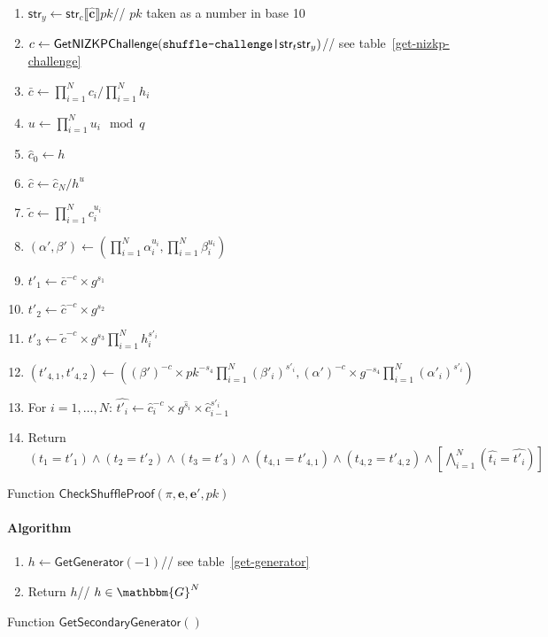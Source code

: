 \documentclass[a4paper]{article}
\newcommand{\G}{\mathbbm{G}}
\begin{document}
\begin{table}
\begin{framed}
\begin{enumerate}
    \item
      $\textsf{str}_y\leftarrow\textsf{str}_c\llbracket\hat{\textbf{c}}\rrbracket
      pk$\hfill// $pk$ taken as a number in base 10
    \item
      $c\leftarrow\textsf{GetNIZKPChallenge}(\verb=shuffle-challenge|=\textsf{str}_t\textsf{str}_y)$\hfill//
      see table~\ref{get-nizkp-challenge}
    \item $\bar{c}\leftarrow\prod_{i=1}^N c_i/\prod_{i=1}^N h_i$
    \item $u\leftarrow\prod_{i=1}^N u_i\mod q$
    \item $\hat{c}_0\leftarrow h$
    \item $\hat{c}\leftarrow\hat{c}_N/h^u$
    \item $\tilde{c}\leftarrow\prod_{i=1}^N c_i^{u_i}$
    \item $(\alpha',\beta')\leftarrow(\prod_{i=1}^N \alpha_i^{u_i},\prod_{i=1}^N \beta_i^{u_i})$
    \item $t'_1\leftarrow\bar{c}^{-c}\times g^{s_1}$
    \item $t'_2\leftarrow\hat{c}^{-c}\times g^{s_2}$
    \item $t'_3\leftarrow\tilde{c}^{-c}\times g^{s_3}\prod_{i=1}^N h_i^{s'_i}$
    \item
      $(t'_{4,1},t'_{4,2})\leftarrow((\beta')^{-c}\times
      pk^{-s_4}\prod_{i=1}^N(\beta'_i)^{s'_i},(\alpha')^{-c}\times
      g^{-s_4}\prod_{i=1}^N(\alpha'_i)^{s'_i})$
    \item For $i=1,\dots,N$: $\hat{t'_i}\leftarrow\hat{c}_i^{-c}\times g^{\hat{s}_i}\times\hat{c}_{i-1}^{s'_i}$
    \item Return
      $(t_1=t'_1)\land(t_2=t'_2)\land(t_3=t'_3)\land(t_{4,1}=t'_{4,1})\land(t_{4,2}=t'_{4,2})\land\left[\bigwedge_{i=1}^N(\hat{t_i}=\hat{t'_i})\right]$
    \end{enumerate}
  \end{framed}
  \caption{Function $\mathsf{CheckShuffleProof}(\pi,\textbf{e},\textbf{e}',pk)$}
  \label{check-shuffle-proof}
\end{table}

\begin{table}
  \begin{framed}
    \noindent\paragraph{Algorithm}
    \begin{enumerate}
    \item $h\leftarrow\textsf{GetGenerator}(-1)$\hfill// see
      table~\ref{get-generator}
    \item Return $h$\hfill// $h\in\G^N$
    \end{enumerate}
  \end{framed}
  \caption{Function $\mathsf{GetSecondaryGenerator}()$}
  \label{get-secondary-generator}
\end{table}
\end{document}
